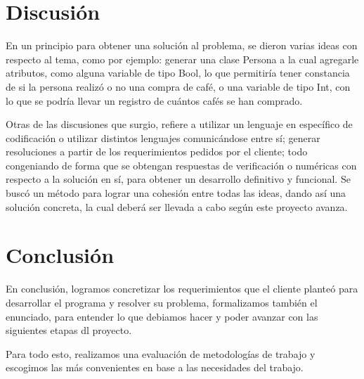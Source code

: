 \documentclass[twocolumn,11pts]{IEEEtran}
\begin{document}
\section{Discusión}
En un principio para obtener una solución al problema, se dieron varias ideas con respecto al tema, como por ejemplo: generar una clase Persona a la cual agregarle atributos, como alguna variable de tipo Bool, lo que permitiría tener constancia de si la persona realizó o no una compra de café, o una variable de tipo Int, con lo que se podría llevar un registro de cuántos cafés se han comprado. 

Otras de las discusiones que surgio, refiere a utilizar un lenguaje en específico de codificación o utilizar distintos lenguajes comunicándose entre sí; generar resoluciones a partir de los requerimientos pedidos por el cliente; todo congeniando de forma que se obtengan respuestas de verificación o numéricas con respecto a la solución en sí, para obtener un desarrollo definitivo y funcional. Se buscó un método para lograr una cohesión entre todas las ideas, dando así una solución concreta, la cual deberá ser llevada a cabo según este proyecto avanza.

\section{Conclusión}
En conclusión, logramos concretizar los requerimientos que el cliente planteó para desarrollar el programa y resolver su problema, formalizamos también el enunciado, para entender lo que debiamos hacer y poder avanzar con las siguientes etapas dl proyecto.

Para todo esto, realizamos una evaluación de metodologías de trabajo y escogimos las más convenientes en base a las necesidades del trabajo.



%
%

\end{document}
